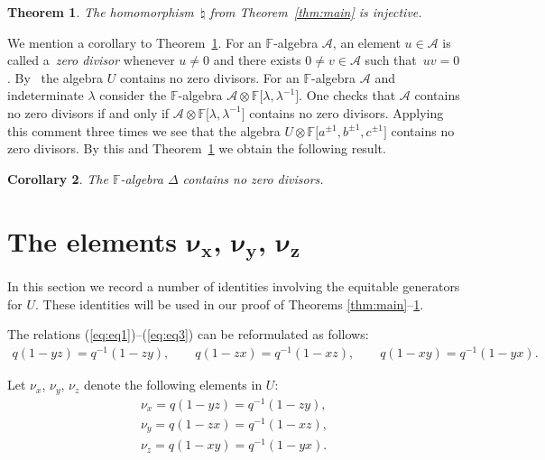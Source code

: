 \documentclass[11pt]{article}
\numberwithin{equation}{section}
\newtheorem{Theorem}{Theorem}[section]
\newtheorem{Corollary}[Theorem]{Corollary}
\begin{document}
\begin{Theorem}
\label{thm:main3}
The
homomorphism~$\natural$
from Theorem~{\rm \ref{thm:main}} is injective.
\end{Theorem}


We mention a corollary to
Theorem~\ref{thm:main3}.
For an $\mathbb F$-algebra $\mathcal A$,
an element $u \in {\mathcal A}$ is called a~{\it zero divisor}
whenever $u\not=0$ and
there exists $0 \not=v \in \mathcal A$
such that~$uv=0$.
By~\cite[Proposition~1.8]{jantzen}
the
algebra $U$
contains no zero divisors.
For an $\mathbb F$-algebra $\mathcal A$
and indeterminate $\lambda$ consider the $\mathbb F$-algebra
${\mathcal A}\otimes \mathbb F \lbrack \lambda,\lambda^{-1}\rbrack$.
One checks that
$\mathcal A$ contains no zero divisors if and only if
${\mathcal A}\otimes \mathbb F \lbrack \lambda,\lambda^{-1}\rbrack$
contains no zero divisors.
Applying this comment three times we see that
the algebra
$
U \otimes
\mathbb F \lbrack a^{\pm 1}, b^{\pm 1}, c^{\pm 1}\rbrack
$ contains no zero divisors.
By this and
Theorem~\ref{thm:main3} we obtain the following result.

\begin{Corollary}
\label{cor:nozerodiv}
The $\mathbb F$-algebra $\Delta$ contains no zero divisors.
\end{Corollary}
\setcounter{section}{2}
\setcounter{subsection}{0}
\setcounter{subsubsection}{0}
\setcounter{Theorem}{19}
\setcounter{equation}{18}
\section[The elements $\nu_x$, $\nu_y$, $\nu_z$]{The elements $\boldsymbol{\nu_x}$, $\boldsymbol{\nu_y}$, $\boldsymbol{\nu_z}$}\label{section3}

In this section we record a number of
identities involving
the equitable generators for
$U$.
These identities will be used in our
proof of Theorems
\ref{thm:main}--\ref{thm:main3}.


The relations
(\ref{eq:eq1})--(\ref{eq:eq3})
can be reformulated as follows:
\begin{gather*}
q(1-yz) = q^{-1}(1-zy),
\qquad
q(1-zx) = q^{-1}(1-xz),
\qquad
q(1-xy) = q^{-1}(1-yx).
\end{gather*}

\begin{Definition}
\label{def:nx}
Let $\nu_x$, $\nu_y$, $\nu_z$ denote the following elements
in
$U$:
\begin{gather}
 \nu_x = q(1-yz)=q^{-1}(1-zy),
\label{eq:defnx}
\\
 \nu_y = q(1-zx)=q^{-1}(1-xz),
\label{eq:defny}
\\
 \nu_z = q(1-xy)=q^{-1}(1-yx).
\label{eq:defnz}
\end{gather}
\end{Definition}
\end{document}
